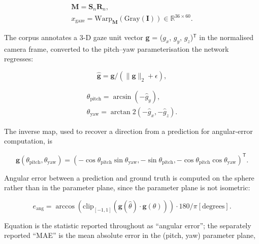 \begin{equation}
\label{eq:16}
\begin{aligned}
\mathbf{M} = \mathbf{S}_n \mathbf{R}_n, \\
x_{\mathrm{gaze}} = \mathrm{Warp}_{\mathbf{M}} ( \mathrm{Gray} ( \mathbf{I} ) ) \in \mathbb{R}^{36\times 60}.
\end{aligned}
\end{equation}

The corpus annotates a 3-D gaze unit vector \textbf{g} = ($g_{x}$, $g_{y}$, $g_{z}$)$^{\mathsf{T}}$ in the normalised camera frame, converted to the pitch--yaw parameterisation the network regresses:

\begin{equation}
\label{eq:17}
\hat{\mathbf{g}} = \mathbf{g} / ( \|\mathbf{g}\|_{2} + \epsilon ),
\end{equation}

\begin{equation}
\label{eq:18}
\begin{aligned}
\theta _{\mathrm{pitch}} = \arcsin( - \hat{g}_y ), \\
\theta _{\mathrm{yaw}} = \arctan2( - \hat{g}_x , - \hat{g}_z ).
\end{aligned}
\end{equation}

The inverse map, used to recover a direction from a prediction for angular-error computation, is

\begin{equation}
\label{eq:19}
\mathbf{g}(\theta _{\mathrm{pitch}}, \theta _{\mathrm{yaw}}) = ( - \cos \theta _{\mathrm{pitch}} \sin \theta _{\mathrm{yaw}} , - \sin \theta _{\mathrm{pitch}} , - \cos \theta _{\mathrm{pitch}} \cos \theta _{\mathrm{yaw}} )^{\mathsf{T}}.
\end{equation}

Angular error between a prediction and ground truth is computed on the sphere rather than in the parameter plane, since the parameter plane is not isometric:

\begin{equation}
\label{eq:20}
e_{\mathrm{ang}} = \arccos ( \mathrm{clip}_{[-1,1]} ( \mathbf{g}(\hat{\theta }) \cdot \mathbf{g}(\theta ) ) ) \cdot 180/\pi [\text{degrees}].
\end{equation}

Equation  is the statistic reported throughout as ``angular error''; the separately reported ``MAE'' is the mean absolute error in the (pitch, yaw) parameter plane,

